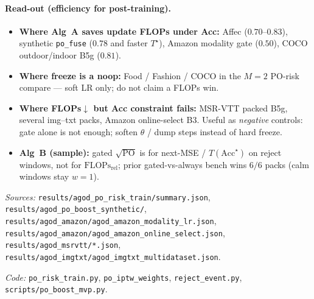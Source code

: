 \documentclass[11pt]{article}
\newcommand{\PO}{\mathrm{PO}}
\newcommand{\Acc}{\mathrm{Acc}}
\newcommand{\Flops}{\mathrm{FLOPs}_{\mathrm{rel}}}
\begin{document}
\paragraph{Read-out (efficiency for post-training).}
\begin{itemize}[leftmargin=1.2em,itemsep=0.2em]
  \item \textbf{Where Alg~A saves update FLOPs under Acc:}
        Affec ($0.70$--$0.83$), synthetic \texttt{po\_fuse}
        ($0.78$ and faster $T^\star$), Amazon modality gate
        ($0.50$), COCO outdoor/indoor B5g ($0.81$).
  \item \textbf{Where freeze is a noop:} Food / Fashion / COCO
        in the $M{=}2$ PO-risk compare --- soft LR only; do not
        claim a FLOPs win.
  \item \textbf{Where FLOPs$\downarrow$ but Acc constraint fails:}
        MSR-VTT packed B5g, several img--txt packs, Amazon
        online-select B3. Useful as \emph{negative} controls:
        gate alone is not enough; soften $\theta$ / dump steps
        instead of hard freeze.
  \item \textbf{Alg~B (sample):} gated $\sqrt{\PO}$ is for
        next-MSE / $T(\Acc^\star)$ on reject windows, not for
        $\Flops$; prior gated-vs-always bench wins $6/6$ packs
        (calm windows stay $w{=}1$).
\end{itemize}

\vspace{0.6em}
\noindent\textit{Sources:}
\texttt{results/agod\_po\_risk\_train/summary.json},
\texttt{results/agod\_po\_boost\_synthetic/},
\texttt{results/agod\_amazon/agod\_amazon\_modality\_lr.json},
\texttt{results/agod\_amazon/agod\_amazon\_online\_select.json},
\texttt{results/agod\_msrvtt/*.json},
\texttt{results/agod\_imgtxt/agod\_imgtxt\_multidataset.json}.

\vspace{0.4em}
\noindent\textit{Code:}
\texttt{po\_risk\_train.py}, \texttt{po\_iptw\_weights},
\texttt{reject\_event.py}, \texttt{scripts/po\_boost\_mvp.py}.
\end{document}

